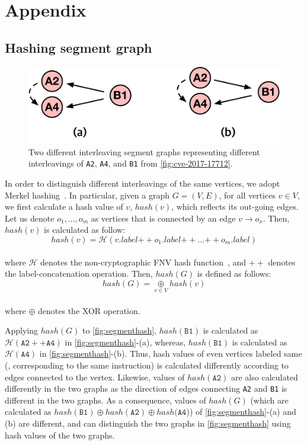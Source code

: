 \section{Appendix}


\subsection{Hashing segment graph}
\label{s:appendix:hash}

\begin{figure}[t]
  \centering
  \includegraphics[width=0.7\linewidth]{fig/segmenthash.pdf}
  \caption{Two different interleaving segment graphs representing
    different interleavings of \texttt{A2}, \texttt{A4}, and
    \texttt{B1} from \autoref{fig:cve-2017-17712}.}
  \label{fig:segmenthash}
\end{figure}
%

In order to distinguish different interleavings of the same vertices,
we adopt Merkel hashing~\cite{treehashing, treehashing2}.
%
In particular, given a graph $G = (V, E)$, for all vertices $v \in V$,
we first calculate a hash value of $v$, $hash(v)$, which reflects its
out-going edges.
%
Let us denote $o_1, ..., o_m$ as vertices that is connected by an edge
$v \rightarrow o_x$. Then, $hash(v)$ is calculated as follow:
%
%
\\
\[
  hash(v) = \mathcal{H}(v.label {++} o_1.label {++} ... {++}
  o_m.label)
\]
\\
%
where $\mathcal{H}$ denotes the non-cryptographic FNV hash
function~\cite{fnv, fnv-go}, and ${++}$ denotes the
label-concatenation operation.
%
Then, $hash(G)$ is defined as follows:
%
\\[1pt]
\[
  hash(G) = \underset{v \in V}{\oplus} hash(v)
\]
\\[1pt]
%
where $\oplus$ denotes the XOR operation.

Applying $hash(G)$ to \autoref{fig:segmenthash}, $hash(\texttt{B1})$
is calculated as $\mathcal{H}(\texttt{A2} ++ \texttt{A4})$ in
\autoref{fig:segmenthash}-(a), whereas, $hash(\texttt{B1})$ is
calculated as $\mathcal{H}(\texttt{A4})$ in
\autoref{fig:segmenthash}-(b).
%
Thus, hash values of even vertices labeled same (\ie, corresponding to
the same instruction) is calculated differently according to edges
connected to the vertex.
%
Likewise, values of $hash(\texttt{A2})$ are also calculated
differently in the two graphs as the direction of edges connecting
\texttt{A2} and \texttt{B1} is different in the two graphs.
%
As a consequence, values of $hash(G)$ (which are calculated as
$hash(\texttt{B1}) \oplus hash(\texttt{A2}) \oplus hash(\texttt{A4}$))
of \autoref{fig:segmenthash}-(a) and (b) are different, and \sys can
distinguish the two graphs in \autoref{fig:segmenthash} using hash
values of the two graphs.



